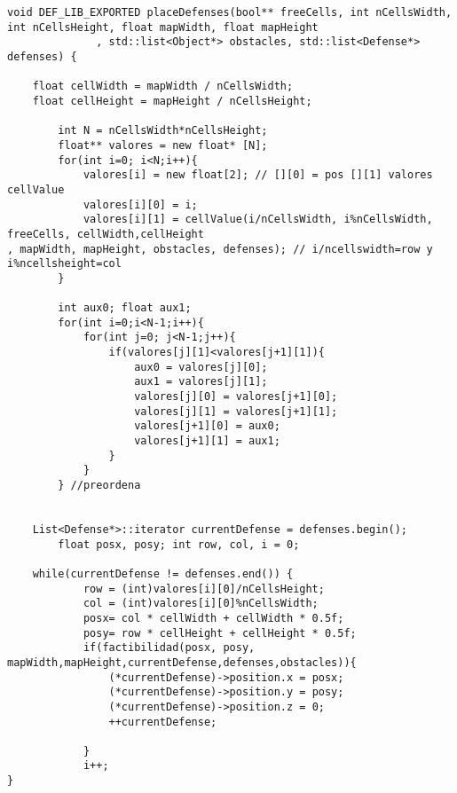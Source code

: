 \begin{lstlisting}
void DEF_LIB_EXPORTED placeDefenses(bool** freeCells, int nCellsWidth, int nCellsHeight, float mapWidth, float mapHeight
              , std::list<Object*> obstacles, std::list<Defense*> defenses) {

    float cellWidth = mapWidth / nCellsWidth;
    float cellHeight = mapHeight / nCellsHeight;

		int N = nCellsWidth*nCellsHeight;
		float** valores = new float* [N];
		for(int i=0; i<N;i++){
			valores[i] = new float[2]; // [][0] = pos [][1] valores cellValue
			valores[i][0] = i;
			valores[i][1] = cellValue(i/nCellsWidth, i%nCellsWidth, freeCells, cellWidth,cellHeight
, mapWidth, mapHeight, obstacles, defenses); // i/ncellswidth=row y i%ncellsheight=col
		}

		int aux0; float aux1;
		for(int i=0;i<N-1;i++){
			for(int j=0; j<N-1;j++){
				if(valores[j][1]<valores[j+1][1]){
					aux0 = valores[j][0];
					aux1 = valores[j][1];
					valores[j][0] = valores[j+1][0];
					valores[j][1] = valores[j+1][1];
					valores[j+1][0] = aux0;
					valores[j+1][1] = aux1;
				}
			}
		} //preordena
		

    List<Defense*>::iterator currentDefense = defenses.begin();
		float posx, posy; int row, col, i = 0;

    while(currentDefense != defenses.end()) {
			row = (int)valores[i][0]/nCellsHeight;
			col = (int)valores[i][0]%nCellsWidth;
			posx= col * cellWidth + cellWidth * 0.5f;
			posy= row * cellHeight + cellHeight * 0.5f;
			if(factibilidad(posx, posy, mapWidth,mapHeight,currentDefense,defenses,obstacles)){
				(*currentDefense)->position.x = posx;
				(*currentDefense)->position.y = posy;
				(*currentDefense)->position.z = 0;
				++currentDefense;

			}
			i++;
}

\end{lstlisting}
